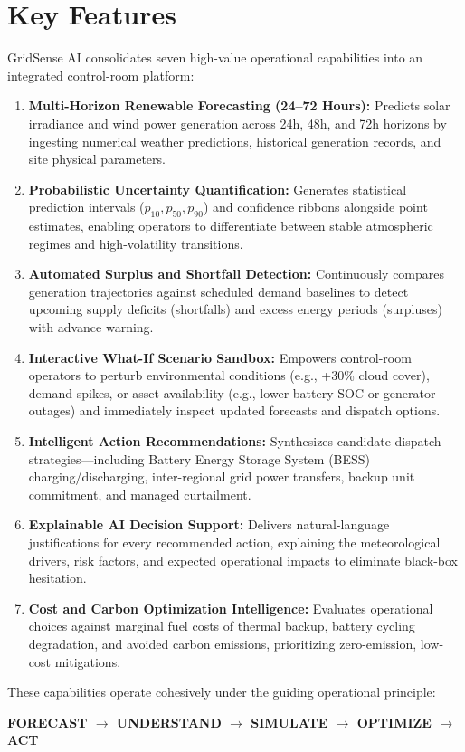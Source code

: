 \section{Key Features}
\label{sec:key_features}

GridSense AI consolidates seven high-value operational capabilities into an integrated control-room platform:

\begin{enumerate}[leftmargin=1.8em, itemsep=0.55em]
    \item \textbf{Multi-Horizon Renewable Forecasting (24--72 Hours):} Predicts solar irradiance and wind power generation across 24h, 48h, and 72h horizons by ingesting numerical weather predictions, historical generation records, and site physical parameters.
    
    \item \textbf{Probabilistic Uncertainty Quantification:} Generates statistical prediction intervals ($p_{10}, p_{50}, p_{90}$) and confidence ribbons alongside point estimates, enabling operators to differentiate between stable atmospheric regimes and high-volatility transitions.
    
    \item \textbf{Automated Surplus and Shortfall Detection:} Continuously compares generation trajectories against scheduled demand baselines to detect upcoming supply deficits (shortfalls) and excess energy periods (surpluses) with advance warning.
    
    \item \textbf{Interactive What-If Scenario Sandbox:} Empowers control-room operators to perturb environmental conditions (e.g., +30\% cloud cover), demand spikes, or asset availability (e.g., lower battery SOC or generator outages) and immediately inspect updated forecasts and dispatch options.
    
    \item \textbf{Intelligent Action Recommendations:} Synthesizes candidate dispatch strategies---including Battery Energy Storage System (BESS) charging/discharging, inter-regional grid power transfers, backup unit commitment, and managed curtailment.
    
    \item \textbf{Explainable AI Decision Support:} Delivers natural-language justifications for every recommended action, explaining the meteorological drivers, risk factors, and expected operational impacts to eliminate black-box hesitation.
    
    \item \textbf{Cost and Carbon Optimization Intelligence:} Evaluates operational choices against marginal fuel costs of thermal backup, battery cycling degradation, and avoided carbon emissions, prioritizing zero-emission, low-cost mitigations.
\end{enumerate}

These capabilities operate cohesively under the guiding operational principle:
\begin{center}
    \textbf{\color{primaryNavy}FORECAST $\longrightarrow$ UNDERSTAND $\longrightarrow$ SIMULATE $\longrightarrow$ OPTIMIZE $\longrightarrow$ ACT}
\end{center}
